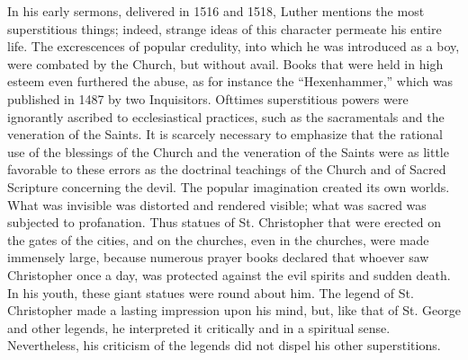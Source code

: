 In his early sermons, delivered in 1516 and 1518, Luther mentions
the most superstitious things; indeed, strange ideas of this character
permeate his entire life. The excrescences of popular credulity, into
which he was introduced as a boy, were combated by the Church,
but without avail. Books that were held in high esteem even furthered
the abuse, as for instance the “Hexenhammer,” which was published
in 1487 by two Inquisitors. Ofttimes superstitious powers were
ignorantly ascribed to ecclesiastical practices, such as the sacramentals
and the veneration of the Saints. It is scarcely necessary to emphasize
that the rational use of the blessings of the Church and the veneration of the Saints were as little favorable to these errors as the
doctrinal teachings of the Church and of Sacred Scripture concerning
the devil. The popular imagination created its own worlds. What
was invisible was distorted and rendered visible; what was sacred
was subjected to profanation. Thus statues of St. Christopher that
were erected on the gates of the cities, and on the churches, even
in the churches, were made immensely large, because numerous prayer
books declared that whoever saw Christopher once a day, was protected against the evil spirits and sudden death. In his youth, these
giant statues were round about him. The legend of St. Christopher
made a lasting impression upon his mind, but, like that of St.
George and other legends, he interpreted it critically and in a spiritual sense. Nevertheless, his criticism of the legends did not dispel
his other superstitions.
